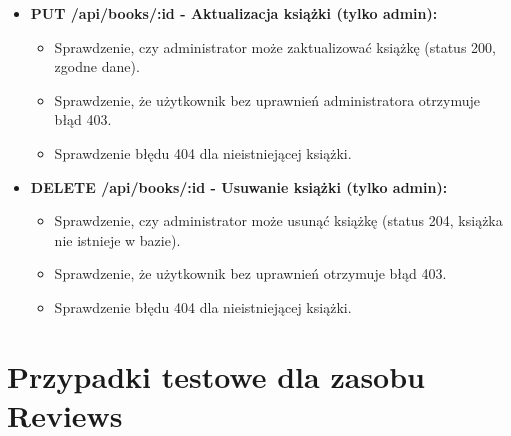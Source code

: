 \documentclass{article}
\begin{document}
\begin{itemize}
    \item \textbf{PUT /api/books/:id - Aktualizacja książki (tylko admin):}
    \begin{itemize}
        \item Sprawdzenie, czy administrator może zaktualizować książkę (status 200, zgodne dane).
        \item Sprawdzenie, że użytkownik bez uprawnień administratora otrzymuje błąd 403.
        \item Sprawdzenie błędu 404 dla nieistniejącej książki.
    \end{itemize}

    \item \textbf{DELETE /api/books/:id - Usuwanie książki (tylko admin):}
    \begin{itemize}
        \item Sprawdzenie, czy administrator może usunąć książkę (status 204, książka nie istnieje w bazie).
        \item Sprawdzenie, że użytkownik bez uprawnień otrzymuje błąd 403.
        \item Sprawdzenie błędu 404 dla nieistniejącej książki.
    \end{itemize}
\end{itemize}

\section{Przypadki testowe dla zasobu Reviews}
\end{document}
